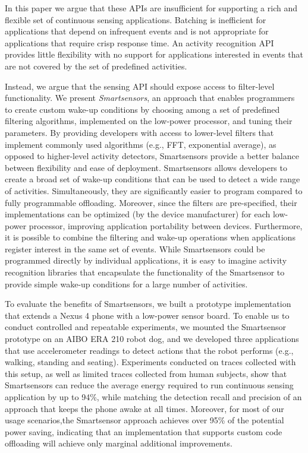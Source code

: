In this paper we argue that these APIs are insufficient for supporting
a rich and flexible set of continuous sensing applications.
Batching is inefficient for applications that depend on infrequent
events and is not appropriate for applications that require crisp
response time.  An activity recognition API provides little
flexibility with no support for applications interested in events that
are not covered by the set of predefined activities.  

Instead, we argue that the sensing API should expose access to
filter-level functionality.  We present {\em Smartsensors}, an
approach that enables programmers to create custom wake-up conditions
by choosing among a set of predefined filtering algorithms, implemented 
on the low-power processor, and tuning
their parameters.  By providing developers with access to lower-level
filters that implement commonly used algorithms (e.g., FFT,
exponential average), as opposed to higher-level activity detectors,
Smartsensors provide a better balance between flexibility and ease of
deployment.  Smartsensors allows developers to create a broad set of
wake-up conditions that can be used to detect a wide range of
activities.  Simultaneously, they are significantly easier to program
compared to fully programmable offloading.  Moreover, since the
filters are pre-specified, their implementations can be optimized (by
the device manufacturer) for each low-power processor, improving
application portability between devices.  Furthermore, it is possible
to combine the filtering and wake-up operations when applications
register interest in the same set of events.  While Smartsensors could
be programmed directly by individual applications, it is easy to
imagine activity recognition libraries that encapsulate the
functionality of the Smartsensor to provide simple wake-up conditions
for a large number of activities.

To evaluate the benefits of Smartsensors, we built a prototype
implementation that extends a Nexus 4 phone with a low-power sensor
board.  To enable us to conduct controlled and repeatable experiments,
we mounted the Smartsensor prototype on an AIBO ERA 210 robot dog, and
we developed three applications that use accelerometer readings to
detect actions that the robot performs (e.g., walking, standing and
seating).  Experiments conducted on traces collected with this setup,
as well as limited traces collected from human subjects, show that
Smartsensors can reduce the average energy required to run continuous
sensing application by up to 94\%, while matching the detection recall
and precision of an approach that keeps the phone awake at all times.
Moreover, for most of our usage scenarios,the Smartsensor approach
achieves over 95\% of the potential power saving, indicating that an
implementation that supports custom code offloading will
achieve only marginal additional improvements.

